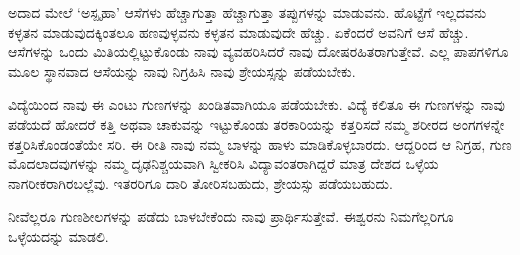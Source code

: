 ಅದಾದ ಮೇಲೆ `ಅಸ್ಪೃಹಾ' ಆಸೆಗಳು ಹೆಚ್ಚಾಗುತ್ತಾ ಹೆಚ್ಚಾಗುತ್ತಾ ತಪ್ಪುಗಳನ್ನು ಮಾಡುವನು. ಹೊಟ್ಟೆಗೆ ಇಲ್ಲದವನು ಕಳ್ಳತನ ಮಾಡುವುದಕ್ಕಿಂತಲೂ 
ಹಣವುಳ್ಳವನು ಕಳ್ಳತನ ಮಾಡುವುದೇ ಹೆಚ್ಚು. ಏಕೆಂದರೆ ಅವನಿಗೆ ಆಸೆ ಹೆಚ್ಚು. ಆಸೆಗಳನ್ನು ಒಂದು ಮಿತಿಯಲ್ಲಿಟ್ಟುಕೊಂಡು ನಾವು ವ್ಯವಹರಿಸಿದರೆ ನಾವು 
ದೋಷರಹಿತರಾಗುತ್ತೇವೆ. ಎಲ್ಲ ಪಾಪಗಳಿಗೂ ಮೂಲ ಸ್ಥಾನವಾದ ಆಸೆಯನ್ನು ನಾವು ನಿಗ್ರಹಿಸಿ ನಾವು ಶ್ರೇಯಸ್ಸನ್ನು ಪಡೆಯಬೇಕು.

ವಿದ್ಯೆಯಿಂದ ನಾವು ಈ ಎಂಟು ಗುಣಗಳನ್ನು ಖಂಡಿತವಾಗಿಯೂ ಪಡೆಯಬೇಕು. ವಿದ್ಯೆ ಕಲಿತೂ ಈ ಗುಣಗಳನ್ನು ನಾವು ಪಡೆಯದೆ ಹೋದರೆ ಕತ್ತಿ ಅಥವಾ 
ಚಾಕುವನ್ನು ಇಟ್ಟುಕೊಂಡು ತರಕಾರಿಯನ್ನು ಕತ್ತರಿಸದೆ ನಮ್ಮ ಶರೀರದ ಅಂಗಗಳನ್ನೇ ಕತ್ತರಿಸಿಕೊಂಡಂತೆಯೇ ಸರಿ. ಈ ರೀತಿ ನಾವು ನಮ್ಮ ಬಾಳನ್ನು 
ಹಾಳು ಮಾಡಿಕೊಳ್ಳಬಾರದು. ಆದ್ದರಿಂದ ಆ ನಿಗ್ರಹ, ಗುಣ ಮೊದಲಾದವುಗಳನ್ನು ನಮ್ಮ ದೃಢನಿಶ್ಚಯವಾಗಿ ಸ್ವೀಕರಿಸಿ ವಿದ್ಯಾವಂತರಾಗಿದ್ದರೆ ಮಾತ್ರ 
ದೇಶದ ಒಳ್ಳೆಯ ನಾಗರೀಕರಾಗಿರಬಲ್ಲೆವು. ಇತರರಿಗೂ ದಾರಿ ತೋರಿಸಬಹುದು, ಶ್ರೇಯಸ್ಸು ಪಡೆಯಬಹುದು.

ನೀವೆಲ್ಲರೂ ಗುಣಶೀಲಗಳನ್ನು ಪಡೆದು ಬಾಳಬೇಕೆಂದು ನಾವು ಪ್ರಾರ್ಥಿಸುತ್ತೇವೆ. ಈಶ್ವರನು ನಿಮಗೆಲ್ಲರಿಗೂ ಒಳ್ಳೆಯದನ್ನು ಮಾಡಲಿ. 

 

